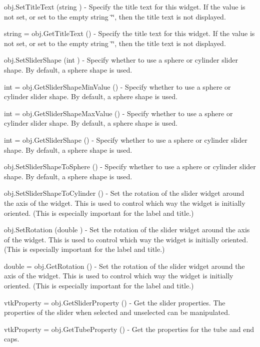 \begin{DoxyItemize}
\item {\ttfamily obj.\-Set\-Title\-Text (string )} -\/ Specify the title text for this widget. If the value is not set, or set to the empty string \char`\"{}\char`\"{}, then the title text is not displayed.  
\item {\ttfamily string = obj.\-Get\-Title\-Text ()} -\/ Specify the title text for this widget. If the value is not set, or set to the empty string \char`\"{}\char`\"{}, then the title text is not displayed.  
\item {\ttfamily obj.\-Set\-Slider\-Shape (int )} -\/ Specify whether to use a sphere or cylinder slider shape. By default, a sphere shape is used.  
\item {\ttfamily int = obj.\-Get\-Slider\-Shape\-Min\-Value ()} -\/ Specify whether to use a sphere or cylinder slider shape. By default, a sphere shape is used.  
\item {\ttfamily int = obj.\-Get\-Slider\-Shape\-Max\-Value ()} -\/ Specify whether to use a sphere or cylinder slider shape. By default, a sphere shape is used.  
\item {\ttfamily int = obj.\-Get\-Slider\-Shape ()} -\/ Specify whether to use a sphere or cylinder slider shape. By default, a sphere shape is used.  
\item {\ttfamily obj.\-Set\-Slider\-Shape\-To\-Sphere ()} -\/ Specify whether to use a sphere or cylinder slider shape. By default, a sphere shape is used.  
\item {\ttfamily obj.\-Set\-Slider\-Shape\-To\-Cylinder ()} -\/ Set the rotation of the slider widget around the axis of the widget. This is used to control which way the widget is initially oriented. (This is especially important for the label and title.)  
\item {\ttfamily obj.\-Set\-Rotation (double )} -\/ Set the rotation of the slider widget around the axis of the widget. This is used to control which way the widget is initially oriented. (This is especially important for the label and title.)  
\item {\ttfamily double = obj.\-Get\-Rotation ()} -\/ Set the rotation of the slider widget around the axis of the widget. This is used to control which way the widget is initially oriented. (This is especially important for the label and title.)  
\item {\ttfamily vtk\-Property = obj.\-Get\-Slider\-Property ()} -\/ Get the slider properties. The properties of the slider when selected and unselected can be manipulated.  
\item {\ttfamily vtk\-Property = obj.\-Get\-Tube\-Property ()} -\/ Get the properties for the tube and end caps.  

\end{DoxyItemize}
